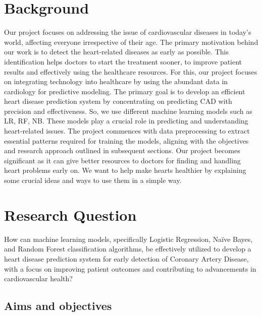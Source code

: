 \section{Background}
\label{sec:into_back}
Our project focuses on addressing the issue of cardiovascular diseases in today's world, 
affecting everyone irrespective of their age. The primary motivation behind our work is to 
detect the heart-related diseases as early as possible. This identification helps doctors to 
start the treatment sooner, to improve patient results and effectively using the healthcare 
resources. For this, our project focuses on integrating technology into healthcare by using the 
abundant data in cardiology for predictive modeling. The primary goal is to develop an 
efficient heart disease prediction system by concentrating on predicting CAD with precision and effectiveness. So, we use different machine learning models such as 
LR, RF, NB. These models play a crucial role in 
predicting and understanding heart-related issues. The project commences with data preprocessing to extract essential patterns required for training the models, aligning with the objectives and research approach outlined in subsequent sections. Our 
project becomes significant as it can give better resources to doctors for finding and handling 
heart problems early on. We want to help make hearts healthier by explaining some crucial ideas 
and ways to use them in a simple way.

\section{Research Question}
\label{sec:intro_prob_art}
How can machine learning models, specifically Logistic Regression, Naïve Bayes, and Random 
Forest classification algorithms, be effectively utilized to develop a heart disease prediction 
system for early detection of Coronary Artery Disease, with a focus on improving patient 
outcomes and contributing to advancements in cardiovascular health?

\subsection{Aims and objectives}
\label{sec:intro_aims_obj}
 

